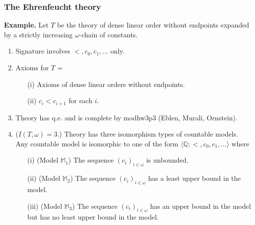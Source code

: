\documentclass[t,xcolor=dvipsnames,handout]{beamer}
\theoremstyle{theoremFermat}
\theoremstyle{reimann}
\theoremstyle{ACExample}
\begin{document}
\begin{frame} 
  \frametitle{The Ehrenfeucht theory}

  \pause

{\bf Example.}
Let $T$ be the theory of dense linear order without endpoints
expanded by a strictly increasing $\omega$-chain of constants. \pause

\bigskip

\begin{enumerate}
\item Signature involves $<, c_0, c_1, \ldots$ only. \pause

\item Axioms for $T$ = \pause
\begin{enumerate}
\item[(i)] Axioms of dense linear orders without endpoints. \pause
\item[(ii)] $c_i < c_{i+1}$ for each $i$. \pause
\end{enumerate}

\item Theory has q.e. and is complete by modhw3p3 (Eblen, Murali, Ornstein). \pause

\item   ($I(T,\omega)=3$.) \pause
  Theory has three isomorphism types of countable models. \pause
Any countable model is isomorphic
to one of the form $\langle \mathbb Q; <, c_0, c_1,\ldots\rangle$
where \pause
\begin{enumerate}
\item[(i)] (Model $\mathbb M_1$)
  The sequence $(c_i)_{i\in\omega}$ is unbounded. \pause
\item[(ii)] (Model $\mathbb M_2$)  The sequence $(c_i)_{i\in\omega}$ has a least upper bound in the model. \pause
\item[(iii)] (Model $\mathbb M_3$)  The sequence $(c_i)_{i\in\omega}$ has an upper bound in the model but has no least upper bound in the model. \pause
\end{enumerate}
\end{enumerate}

\end{frame}
\end{document}
